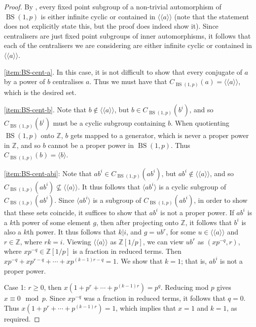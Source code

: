 \documentclass[11pt]{amsart}
\theoremstyle{definition}
\numberwithin{theorem}{section}
\DeclareMathOperator{\BS}{BS}
\newcommand{\Z}{\mathbb{Z}}
\begin{document}
\begin{proof}
	By \cite[Theorem 3.2]{BS-fixed}, every fixed point subgroup of a non-trivial
	automorphism of \(\BS(1, p)\) is either infinite cyclic or contained in
	\(\langle \langle a \rangle \rangle\) (note that the statement does not
	explicitly state this, but the proof does indeed show it). Since
	centralisers are just fixed point subgroups of inner automorphisms, it
	follows that each of the centralisers we are considering are either
	infinite cyclic or contained in \(\langle \langle a \rangle \rangle\). 

	\eqref{item:BS-cent-a}. In this case, it is not difficult to show that
	every conjugate of \(a\) by a power of \(b\) centralises \(a\). Thus
	we must have that \(C_{\BS(1, p)}(a) = \langle \langle a \rangle \rangle\),
	which is the desired set.

	\eqref{item:BS-cent-b}. Note that \(b \notin \langle \langle a \rangle
	\rangle\), but \(b \in C_{\BS(1, p)}(b^i)\), and so \(C_{\BS(1, p)}(b^i)\)
	must be a cyclic subgroup containing \(b\).  When quotienting \(\BS(1, p)\)
	onto \(\Z\), \(b\) gets mapped to a generator, which is never a proper
	power in \(\Z\), and so \(b\) cannot be a proper power in \(\BS(1, p)\).
	Thus \(C_{\BS(1, p)}(b) = \langle b \rangle\).

	\eqref{item:BS-cent-abi}: Note that \(ab^i \in C_{\BS(1,
	p)}(ab^i)\), but \(ab^i \notin \langle \langle a \rangle \rangle\), and so
	\(C_{\BS(1, p)}(ab^i) \not \subseteq \langle \langle a \rangle \rangle\). 
	It thus follows that \(\langle ab^i \rangle\) is a cyclic subgroup of
	\(C_{\BS(1, p)}(ab^i)\). Since \(\langle ab^i \rangle\) is a subgroup of
	\(C_{\BS(1, p)}(ab^i)\), in order to show that these sets coincide, it
	suffices to show that \(ab^i\) is not a proper power. If \(ab^i\) is a
	\(k\)th power of some element \(g\), then after projecting onto \(\Z\), it
	follows that \(b^i\) is also a \(k\)th power. It thus follows that \(k |
	i\), and \(g = ub^r\), for some \(u \in \langle \langle a \rangle \rangle\)
	and \(r \in \Z\), where \(rk = i\). Viewing \(\langle \langle a \rangle
	\rangle\) as \(\Z[1/p]\), we can view \(ub^r\) as \((xp^{-q}, r)\), where
	\(xp^{-q} \in \Z[1/p]\) is a fraction in reduced terms. Then
	\(xp^{-q} + xp^{r - q} + \cdots + xp^{(k - 1)r - q} = 1\). We show
	that \(k = 1\); that is, \(ab^i\) is not a proper power.

	Case 1: \(r \geq 0\), then \(x(1 + p^r + \cdots + p^{(k - 1)r}) = p^q\).
	Reducing mod \(p\) gives \(x \equiv 0 \mod p\). Since \(x p^{-q}\) was a
	fraction in reduced terms, it follows that \(q = 0\). Thus
	\(x(1+ p^r + \cdots + p^{(k - 1)r}) = 1\), which implies that
	\(x = 1\) and \(k = 1\), as required. 


\end{proof}
\end{document}
